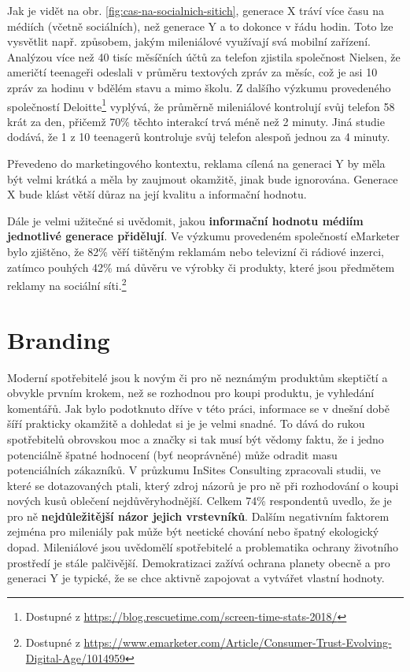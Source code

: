 
Jak je vidět na obr. \ref{fig:cas-na-socialnich-sitich}, generace X tráví více času na médiích (včetně sociálních), než generace Y a to dokonce v řádu hodin. Toto lze vysvětlit např. způsobem, jakým mileniálové využívají svá mobilní zařízení. Analýzou více než 40 tisíc měsíčních účtů za telefon zjistila společnost Nielsen, že američtí teenageři odeslali v průměru  textových zpráv za měsíc, což je asi 10 zpráv za hodinu v bdělém stavu a mimo školu.\cite[s. 33]{bergh2012coolznacky} Z dalšího výzkumu provedeného společností Deloitte\footnote{Dostupné z \url{https://blog.rescuetime.com/screen-time-stats-2018/}} vyplývá, že průměrně mileniálové kontrolují svůj telefon 58 krát za den, přičemž 70\rm \% těchto interakcí trvá méně než 2 minuty. Jiná studie dodává, že 1 z 10 teenagerů kontroluje svůj telefon alespoň jednou za 4 minuty\footnotemark.


Převedeno do marketingového kontextu, reklama cílená na generaci Y by měla být velmi krátká a měla by zaujmout okamžitě, jinak bude ignorována. Generace X bude klást větší důraz na její kvalitu a informační hodnotu.

Dále je velmi užitečné si uvědomit, jakou \textbf{informační hodnotu médiím jednotlivé generace přidělují}. Ve výzkumu provedeném společností eMarketer bylo zjištěno, že 82\rm \% věří tištěným reklamám nebo televizní či rádiové inzerci, zatímco pouhých 42\rm \% má důvěru ve výrobky či produkty, které jsou předmětem reklamy na sociální síti.\footnote{Dostupné z \url{https://www.emarketer.com/Article/Consumer-Trust-Evolving-Digital-Age/1014959}}


\section{Branding}
Moderní spotřebitelé jsou k novým či pro ně neznámým produktům skeptičtí a obvykle prvním krokem, než se rozhodnou pro koupi produktu, je vyhledání komentářů. Jak bylo podotknuto dříve v této práci, informace se v dnešní době šíří prakticky okamžitě a dohledat si je je velmi snadné. To dává do rukou spotřebitelů obrovskou moc a značky si tak musí být vědomy faktu, že i jedno potenciálně špatné hodnocení (byť neoprávněné) může odradit masu potenciálních zákazníků.
V průzkumu InSites Consulting zpracovali studii, ve které se dotazovaných ptali, který zdroj názorů je pro ně při rozhodování o koupi nových kusů oblečení nejdůvěryhodnější. Celkem 74\rm \% respondentů uvedlo, že je pro ně \textbf{nejdůležitější názor jejich vrstevníků}.\cite[s. 43]{bergh2012coolznacky}
Dalším negativním faktorem zejména pro mileniály pak může být neetické chování nebo špatný ekologický dopad. Mileniálové jsou uvědomělí spotřebitelé a problematika ochrany životního prostředí je stále palčivější. Demokratizaci zažívá ochrana planety obecně a pro generaci Y je typické, že se chce aktivně zapojovat a vytvářet vlastní hodnoty.


